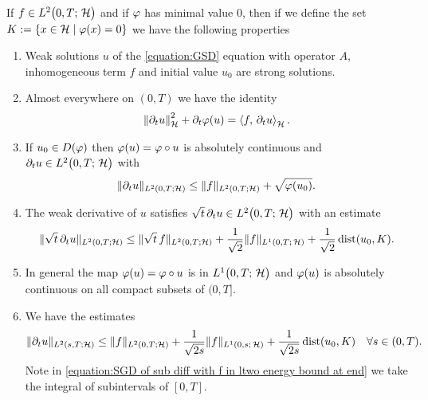 \begin{theorem}\label{theorem:SGD prop of sub diff with f in ltwo}
	If $ f\in L^{2}\big(0,T;\,\mathcal{H}\big) $ and 
	if $ \varphi $ has minimal value $ 0 $, then if we define the
	set $ K:=\{x\in\mathcal{H}\;\vert\; \varphi(x)=0\} $ we have
	the following properties 
	\begin{enumerate}[label=(\roman*)]
		\item Weak solutions $ u $ of the \ref{equation:GSD} equation
		with operator $ A $, inhomogeneous term $ f $ and initial value 
		$ u_0 $ are strong solutions.
		\item Almost everywhere on $ (0,T) $ we have the identity 
		\begin{align*}
			\left\Vert \partial_t u\right\Vert_{\mathcal{H}}^2+\partial_t\varphi(u)=\left\langle f,\,\partial_t u\right\rangle_{\mathcal{H}}.
		\end{align*}
		\item If $ u_0\in D(\varphi) $ then $ \varphi(u)=\varphi\circ u $
		is absolutely continuous and $ \partial_t u\in L^{2}\big(0,T;\,\mathcal{H}\big) $ with
		\begin{align}\label{equation:l2 est of der if init in dom and f in l2}
			\Vert \partial_t u\Vert_{L^2(0,T;\mathcal{H})}
			\leq \Vert f\Vert_{L^2(0,T;\mathcal{H})}
			+\sqrt{\varphi(u_0)}.
		\end{align}
		\item The weak derivative of $ u $ satisfies $ \sqrt{t}\,\partial_t u\in L^{2}\big(0,T;\,\mathcal{H}\big)$ with
		an estimate
		\begin{align}
			\Vert \sqrt{t}\,\partial_t u\Vert_{L^2(0,T;\mathcal{H})}
			\leq \Vert \sqrt{t}\,f\Vert_{L^2(0,T;\mathcal{H})}
			+\frac{1}{\sqrt{2}}\Vert f\Vert_{L^1(0,T;\,\mathcal{H})}
			+\frac{1}{\sqrt{2}}\operatorname{\mathrm{dist}}(u_0, K).
			\label{equation:SGD of sub diff with f in ltwo energy bound}
		\end{align}
		\item In general the map 
		$ \varphi(u)=\varphi\circ u$ is in $L^{1}\big(0,T;\,\mathcal{H}\big) $ and $ \varphi(u) $ is absolutely
		continuous on all compact subsets of $ (0,T] $. 
		\item We have the estimates
		\begin{align}
			\Vert \partial_t u\Vert_{L^2(s,T;\mathcal{H})}
			\leq \Vert f\Vert_{L^2(0,T;\mathcal{H})}
			+\frac{1}{\sqrt{2s}}\Vert f\Vert_{L^1(0,s;\,\mathcal{H})}
			+\frac{1}{\sqrt{2s}}\operatorname{\mathrm{dist}}(u_0, K)
			\quad\forall s\in(0,T).
			\label{equation:SGD of sub diff with f in ltwo energy bound at end}
		\end{align}
		Note in \eqref{equation:SGD of sub diff with f in ltwo energy bound at end}
		we take the integral of subintervals of $ [0,T] $.
	\end{enumerate}
\end{theorem}


